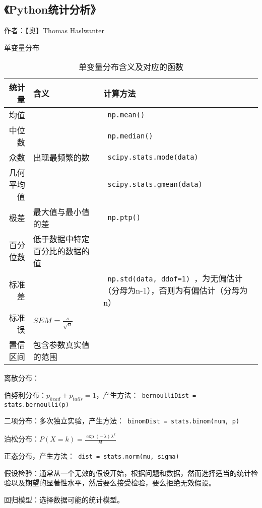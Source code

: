 \subsection{《Python统计分析》}

作者：【奥】Thomas Haslwanter

单变量分布

\begin{table}[htpb]
\centering
\caption{单变量分布含义及对应的函数}
\begin{tabular}{r|l|p{}}

统计量  &  含义  &  计算方法 \\
\hline 
均值  &    & \verb | np.mean() | \\
中位数  &    &  \verb | np.median() |\\ 
众数  &  出现最频繁的数  &  \verb | scipy.stats.mode(data) | \\
几何平均值  &   &  \verb | scipy.stats.gmean(data) |\\ 
极差  &  最大值与最小值的差  &  \verb | np.ptp() | \\
百分位数  &  低于数据中特定百分比的数据的值  &  \\
标准差  &   &  \verb | np.std(data, ddof=1) |，为无偏估计（分母为n-1），否则为有偏估计（分母为n） \\
标准误  &  $SEM=\frac{s}{\sqrt{n}}$  &  \\
置信区间  &  包含参数真实值的范围  & \\

\end{tabular}

\end{table}

离散分布：
\begin{itemize*}
    \item 伯努利分布：$p_{head} + p_{tails} = 1$，产生方法：\verb | bernoulliDist = stats.bernoulli(p) |
    \item 二项分布：多次独立实验，产生方法：\verb | binomDist = stats.binom(num, p) |
    \item 泊松分布：$P(X=k)=\frac{\exp{(-\lambda)}{\lambda}^k}{k!}$
    \item 正态分布，产生方法：\verb | dist = stats.norm(mu, sigma) |
\end{itemize*}

假设检验：通常从一个无效的假设开始，根据问题和数据，然而选择适当的统计检验以及期望的显著性水平，然后要么接受检验，要么拒绝无效假设。

回归模型：选择数据可能的统计模型。

